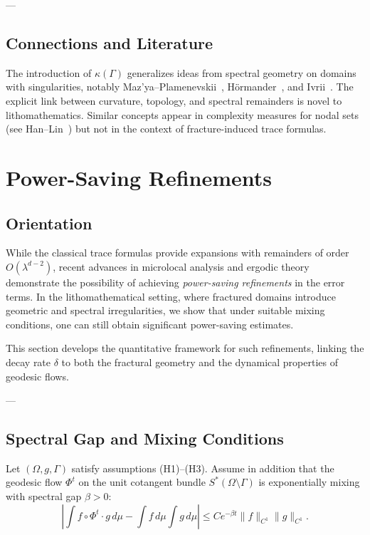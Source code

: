 ---

\subsection*{Connections and Literature}

The introduction of $\kappa(\Gamma)$ generalizes ideas from 
spectral geometry on domains with singularities, 
notably Maz'ya--Plamenevskii~\cite{MazyaPlamenevskii1980}, 
Hörmander~\cite{Hormander1994}, 
and Ivrii~\cite{Ivrii2016}.  
The explicit link between curvature, topology, and spectral remainders 
is novel to lithomathematics.  
Similar concepts appear in complexity measures for nodal sets 
(see Han--Lin~\cite{HanLin2011}) 
but not in the context of fracture-induced trace formulas.


\section{Power-Saving Refinements}
\label{sec:power-saving}

\subsection*{Orientation}
While the classical trace formulas provide expansions with remainders 
of order $O(\lambda^{d-2})$, 
recent advances in microlocal analysis and ergodic theory 
demonstrate the possibility of achieving 
\emph{power-saving refinements} in the error terms.  
In the lithomathematical setting, where fractured domains introduce 
geometric and spectral irregularities, 
we show that under suitable mixing conditions, 
one can still obtain significant power-saving estimates.  

This section develops the quantitative framework for such refinements, 
linking the decay rate $\delta$ to both 
the fractural geometry and the dynamical properties of geodesic flows.

---

\subsection{Spectral Gap and Mixing Conditions}

\begin{hypothesis}
\label{hyp:mixing}
Let $(\Omega,g,\Gamma)$ satisfy assumptions (H1)--(H3).  
Assume in addition that the geodesic flow $\Phi^t$ 
on the unit cotangent bundle $S^*\!(\Omega\setminus\Gamma)$ 
is exponentially mixing with spectral gap $\beta > 0$:
\[
\left| \int f \circ \Phi^t \cdot g \, d\mu - \int f\, d\mu \int g\, d\mu \right| 
\leq C e^{-\beta t} \|f\|_{C^1}\|g\|_{C^1}.
\]
\end{hypothesis}


